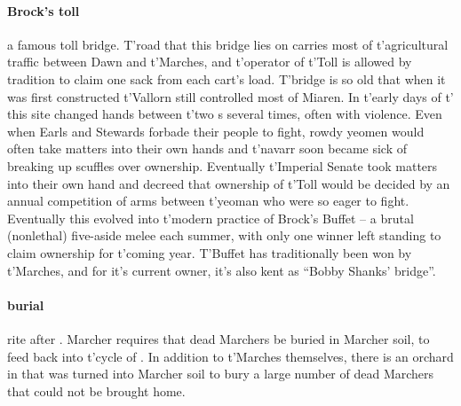 \paragraph{Brock's toll} a famous toll bridge. T'road that this bridge lies on carries most of t'\allowbreak agricultural traffic between Dawn and t'\allowbreak Marches, and t'\allowbreak operator of t'\allowbreak Toll is allowed by tradition to claim one sack from each cart's load. T'bridge is so old that when it was first constructed t'\allowbreak Vallorn still controlled most of Miaren. In t'\allowbreak early days of t'\allowbreak {} this site changed hands between t'\allowbreak two s several times, often with violence. Even when Earls and Stewards forbade their people to fight, rowdy yeomen would often take matters into their own hands and t'\allowbreak navarr soon became sick of breaking up scuffles over ownership. Eventually t'\allowbreak Imperial Senate took matters into their own hand and decreed that ownership of t'\allowbreak Toll would be decided by an annual competition of arms between t'\allowbreak yeoman who were so eager to fight. Eventually this evolved into t'\allowbreak modern practice of Brock's Buffet – a brutal (nonlethal) five-aside melee each summer, with only one winner left standing to claim ownership for t'\allowbreak coming year. T'Buffet has traditionally been won by t'\allowbreak Marches, and for it's current owner, it's also kent as “Bobby Shanks' bridge”.
\paragraph{burial} rite after . Marcher  requires that dead Marchers be buried in Marcher soil, to feed back into t'\allowbreak cycle of . In addition to t'\allowbreak Marches themselves, there is an orchard in  that was turned into Marcher soil to bury a large number of dead Marchers that could not be brought home. 
